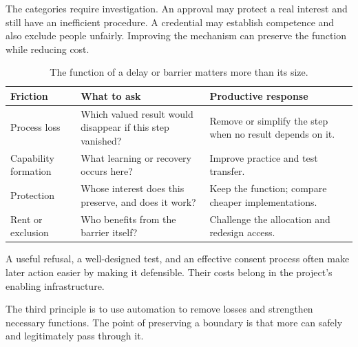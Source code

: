 The categories require investigation. An approval may protect a real interest and still have an inefficient procedure. A credential may establish competence and also exclude people unfairly. Improving the mechanism can preserve the function while reducing cost.

\begin{table}[ht]
\centering\small
\begin{tabularx}{\textwidth}{@{}lYY@{}}
\toprule
Friction & What to ask & Productive response\\
\midrule
Process loss & Which valued result would disappear if this step vanished? & Remove or simplify the step when no result depends on it.\\
Capability formation & What learning or recovery occurs here? & Improve practice and test transfer.\\
Protection & Whose interest does this preserve, and does it work? & Keep the function; compare cheaper implementations.\\
Rent or exclusion & Who benefits from the barrier itself? & Challenge the allocation and redesign access.\\
\bottomrule
\end{tabularx}
\caption{The function of a delay or barrier matters more than its size.}
\end{table}

A useful refusal, a well-designed test, and an effective consent process often make later action easier by making it defensible. Their costs belong in the project's enabling infrastructure.

The third principle is to use automation to remove losses and strengthen necessary functions. The point of preserving a boundary is that more can safely and legitimately pass through it.
